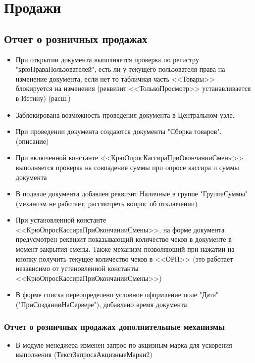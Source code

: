 \section{Продажи}
\subsection{Отчет о розничных продажах}


\begin{itemize}
    \item При открытии документа выполняется проверка по регистру "крюПраваПользователей", есть ли у текущего пользователя права на изменение документа, если нет то табличная часть <<Товары>> блокируется на изменения (реквизит <<ТолькоПросмотр>> устанавливается в Истину) (расш.)
    \item Заблокирована возможность проведения документа в Центральном узле.
    \item При проведении документа создаются документы "Сборка товаров".(описание)
    \item При включенной константе <<КрюОпросКассираПриОкончанииСмены>> выполняется проверка на совпадение суммы при опросе кассира и суммы документа
    \item В подвале документа добавлен реквизит Наличные в группе "ГруппаСуммы" (механизм не работает, рассмотреть вопрос об отключении)
    \item При установленной константе <<КрюОпросКассираПриОкончанииСмены>>,  на форме документа предусмотрен реквизит показывающий количество чеков в документе в момент закрытия смены. Также механизм позволяющий при нажатии на кнопку  получить текущее количество чеков в <<ОРП>> (это работает независимо от установленной константы <<КрюОпросКассираПриОкончанииСмены>>)
    \item В форме списка переопределено условное оформление поле "Дата" ("ПриСозданииНаСервере"), добавлено время документа.
\end{itemize}

\subsubsection{Отчет о розничных продажах дополнительные механизмы}
\begin{itemize}
	\item В модуле менеджера изменен запрос по акцизным марка для ускорения выполнения (ТекстЗапросаАкцизныеМарки2)
\end{itemize}



